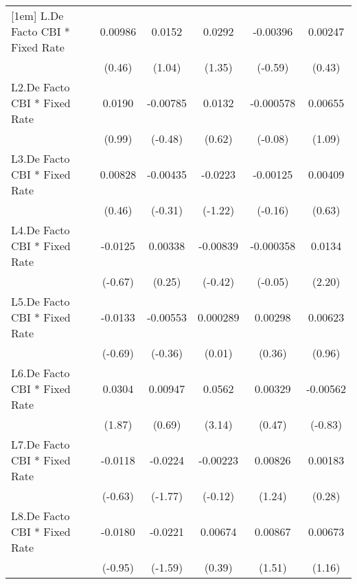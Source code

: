 {\begin{longtable}{l*{5}{c}}
[1em]
L.De Facto CBI * Fixed Rate&  0.00986         &   0.0152         &   0.0292         & -0.00396         &  0.00247         \\
                &   (0.46)         &   (1.04)         &   (1.35)         &  (-0.59)         &   (0.43)         \\
[1em]
L2.De Facto CBI * Fixed Rate&   0.0190         & -0.00785         &   0.0132         &-0.000578         &  0.00655         \\
                &   (0.99)         &  (-0.48)         &   (0.62)         &  (-0.08)         &   (1.09)         \\
[1em]
L3.De Facto CBI * Fixed Rate&  0.00828         & -0.00435         &  -0.0223         & -0.00125         &  0.00409         \\
                &   (0.46)         &  (-0.31)         &  (-1.22)         &  (-0.16)         &   (0.63)         \\
[1em]
L4.De Facto CBI * Fixed Rate&  -0.0125         &  0.00338         & -0.00839         &-0.000358         &   0.0134\sym{*}  \\
                &  (-0.67)         &   (0.25)         &  (-0.42)         &  (-0.05)         &   (2.20)         \\
[1em]
L5.De Facto CBI * Fixed Rate&  -0.0133         & -0.00553         & 0.000289         &  0.00298         &  0.00623         \\
                &  (-0.69)         &  (-0.36)         &   (0.01)         &   (0.36)         &   (0.96)         \\
[1em]
L6.De Facto CBI * Fixed Rate&   0.0304         &  0.00947         &   0.0562\sym{**} &  0.00329         & -0.00562         \\
                &   (1.87)         &   (0.69)         &   (3.14)         &   (0.47)         &  (-0.83)         \\
[1em]
L7.De Facto CBI * Fixed Rate&  -0.0118         &  -0.0224         & -0.00223         &  0.00826         &  0.00183         \\
                &  (-0.63)         &  (-1.77)         &  (-0.12)         &   (1.24)         &   (0.28)         \\
[1em]
L8.De Facto CBI * Fixed Rate&  -0.0180         &  -0.0221         &  0.00674         &  0.00867         &  0.00673         \\
                &  (-0.95)         &  (-1.59)         &   (0.39)         &   (1.51)         &   (1.16)         \\

\end{longtable}}
